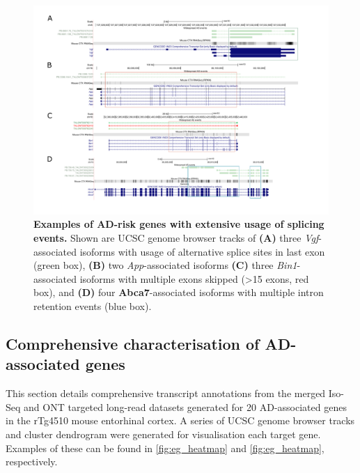 \begin{landscape}
\begin{figure}[]
	\centering
	\includegraphics[page=1,trim={0 1.5cm 0 1cm},clip,scale = 0.85]{Figures/TargetGenesASExamples.pdf}
	\captionsetup{width=1.25\textwidth}
	\caption[Examples of AD-risk genes with extensive usage of splicing events]%
	{\textbf{Examples of AD-risk genes with extensive usage of splicing events.} Shown are UCSC genome browser tracks of \textbf{(A)} three \textit{Vgf}-associated isoforms with usage of alternative splice sites in last exon (green box), \textbf{(B)} two \textit{App}-associated isoforms \textbf{(C)} three \textit{Bin1}-associated isoforms with multiple exons skipped (>15 exons, red box), and \textbf{(D)} four \textbf{Abca7}-associated isoforms with multiple intron retention events (blue box).}
	\label{fig: AS_Examples}
\end{figure}
\end{landscape}
\restoregeometry

\clearpage
\subsection{Comprehensive characterisation of AD-associated genes} 
\label{ch6: target_gene_annotation}
This section details comprehensive transcript annotations from the merged Iso-Seq and ONT targeted long-read datasets generated for 20 AD-associated genes in the rTg4510 mouse entorhinal cortex. A series of UCSC genome browser tracks and cluster dendrogram were generated for visualisation each target gene. Examples of these can be found in \cref{fig:eg_heatmap} and \cref{fig:eg_heatmap}, respectively. 

